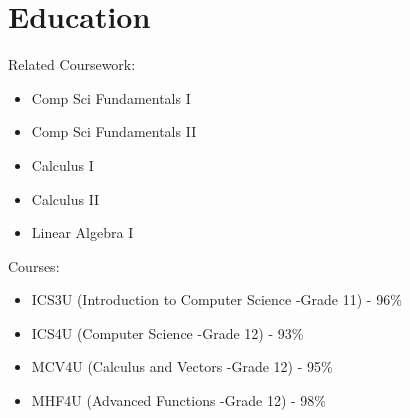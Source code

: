 \documentclass[11pt,a4paper,sans]{moderncv}        %
\begin{document}
\vspace*{-1.05mm}
\makecvtitle
\vspace*{-10mm}

\section{Education}


{}{Related Coursework:}
\vspace{-1.0em}\begin{small}
 \begin{multicols}{3}
    \begin{itemize}
\item Comp Sci Fundamentals I
\item Comp Sci Fundamentals II
\item Calculus I
\item Calculus II
\item Linear Algebra I


    \end{itemize}
    \end{multicols}\end{small}
    


{}{Courses:}
\vspace*{5.5 mm}
\vspace{-1.0em}\begin{small}
    \begin{itemize}
\item ICS3U (Introduction to Computer Science -Grade 11) - 96\%
\item ICS4U (Computer Science -Grade 12) - 93\% 
\item MCV4U (Calculus and Vectors -Grade 12) - 95\%
\item MHF4U (Advanced Functions -Grade 12) - 98\%

    \end{itemize}
    \end{small}
    
\end{document}
